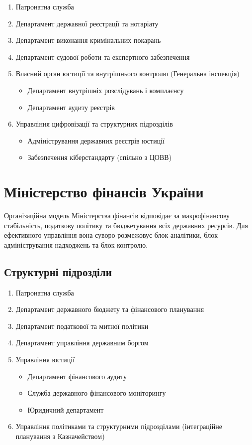\begin{enumerate}
    \item Патронатна служба
    \item Департамент державної реєстрації та нотаріату
    \item Департамент виконання кримінальних покарань
    \item Департамент судової роботи та експертного забезпечення
    \item Власний орган юстиції та внутрішнього контролю (Генеральна інспекція)
    \begin{itemize}
        \item Департамент внутрішніх розслідувань і комплаєнсу
        \item Департамент аудиту реєстрів
    \end{itemize}
    \item Управління цифровізації та структурних підрозділів
    \begin{itemize}
        \item Адміністрування державних реєстрів юстиції
        \item Забезпечення кіберстандарту (спільно з ЦОВВ)
    \end{itemize}
\end{enumerate}

\newpage
\section{Міністерство фінансів України}

Організаційна модель Міністерства фінансів відповідає за макрофінансову стабільність, податкову політику та бюджетування всіх державних ресурсів. Для ефективного управління вона суворо розмежовує блок аналітики, блок адміністрування надходжень та блок контролю.

\subsection*{Структурні підрозділи}

\begin{enumerate}
    \item Патронатна служба
    \item Департамент державного бюджету та фінансового планування
    \item Департамент податкової та митної політики
    \item Департамент управління державним боргом
    \item Управління юстиції
    \begin{itemize}
        \item Департамент фінансового аудиту
        \item Служба державного фінансового моніторингу
        \item Юридичний департамент
    \end{itemize}
    \item Управління політиками та структурними підрозділами (інтеграційне планування з Казначейством)
\end{enumerate}

